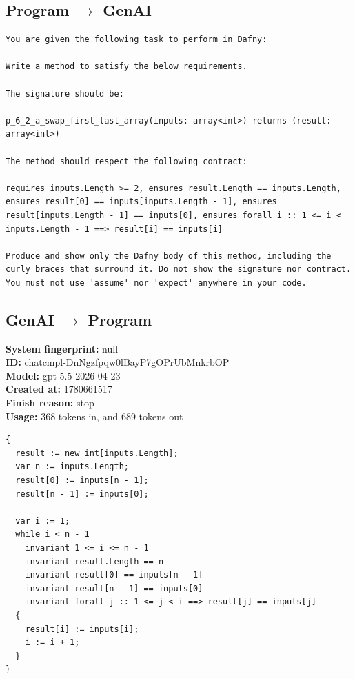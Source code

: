 \documentclass{article}
\begin{document}
\subsection*{Program $\rightarrow$ GenAI}
\begin{lstlisting}
You are given the following task to perform in Dafny:

Write a method to satisfy the below requirements.

The signature should be:

p_6_2_a_swap_first_last_array(inputs: array<int>) returns (result: array<int>)

The method should respect the following contract:

requires inputs.Length >= 2, ensures result.Length == inputs.Length, ensures result[0] == inputs[inputs.Length - 1], ensures result[inputs.Length - 1] == inputs[0], ensures forall i :: 1 <= i < inputs.Length - 1 ==> result[i] == inputs[i]

Produce and show only the Dafny body of this method, including the curly braces that surround it. Do not show the signature nor contract. You must not use 'assume' nor 'expect' anywhere in your code.
\end{lstlisting}
\subsection*{GenAI $\rightarrow$ Program}
\textbf{System fingerprint: }null
\\\textbf{ID: }chatcmpl-DnNgzfpqw0lBayP7gOPrUbMnkrbOP
\\\textbf{Model: }gpt-5.5-2026-04-23
\\\textbf{Created at: }1780661517
\\\textbf{Finish reason: }stop
\\\textbf{Usage: }368 tokens in, and 689 tokens out
\begin{lstlisting}
{
  result := new int[inputs.Length];
  var n := inputs.Length;
  result[0] := inputs[n - 1];
  result[n - 1] := inputs[0];

  var i := 1;
  while i < n - 1
    invariant 1 <= i <= n - 1
    invariant result.Length == n
    invariant result[0] == inputs[n - 1]
    invariant result[n - 1] == inputs[0]
    invariant forall j :: 1 <= j < i ==> result[j] == inputs[j]
  {
    result[i] := inputs[i];
    i := i + 1;
  }
}
\end{lstlisting}
\end{document}
